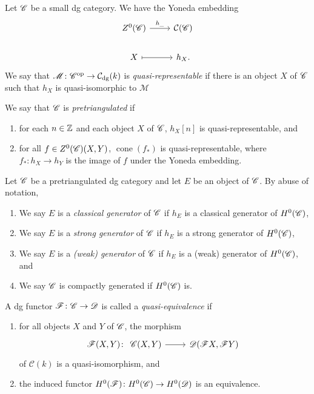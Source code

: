 \documentclass[dissertation.tex]{subfiles}
\begin{document}
\begin{defn}
  Let $\mathscr{C}$ be a small dg category.
  We have the Yoneda embedding 
  $$\begin{tikzcd}
    Z^0(\CC) \arrow{r}{h_{\_}} & \mathcal{C}(\CC)\\
    X \arrow[mapsto]{r} & h_X.
  \end{tikzcd}$$
  We say that $\mathscr{M} \colon \mathscr{C}^\text{op} \rightarrow \mathcal{C}_\text{dg}(k)$ is {\it quasi-representable} if there is an object $X$ of $\mathscr{C}$ such that $h_X$ is quasi-isomorphic to $\mathscr{M}$
  
  We say that $\mathscr{C}$ is {\it pretriangulated} if
  \begin{enumerate}
  \item
    for each $n \in \mathbb{Z}$ and each object $X$ of $\mathscr{C}$, $h_X[n]$ is quasi-representable, and
  \item
    for all $f \in Z^0(\mathscr{C})(X,Y)$, $\operatorname{cone}(f_*)$ is quasi-representable, where $f_* : h_X \rightarrow h_Y$ is the image of $f$ under the Yoneda embedding.
  \end{enumerate}
\end{defn}

\begin{defn}
  Let $\mathscr{C}$ be a pretriangulated dg category and let $E$ be an object of $\mathscr{C}$.
  By abuse of notation, 
  \begin{enumerate}
  \item
    We say $E$ is a {\it classical generator} of $\mathscr{C}$ if $h_E$ is a classical generator of $H^0(\mathscr{C})$,
  \item
    We say $E$ is a {\it strong generator} of $\mathscr{C}$ if $h_E$ is a strong generator of $H^0(\mathscr{C})$,
  \item
    We say $E$ is a {\it (weak) generator} of $\mathscr{C}$ if $h_E$ is a (weak) generator of $H^0(\mathscr{C})$, and
  \item
    We say $\mathscr{C}$ is compactly generated if $H^0(\mathscr{C})$ is.
  \end{enumerate}
\end{defn}


\begin{defn}
  A dg functor $\mathscr{F} \colon \mathscr{C} \rightarrow \mathscr{D}$ is called a {\it quasi-equivalence} if 
  \begin{enumerate}
  \item
    for all objects $X$ and $Y$ of $\mathscr{C}$, the morphism
    $$\mathscr{F}(X,Y) \colon
    \begin{tikzcd}
      \CC(X,Y) \arrow{r} & \D(\mathscr{F}X,\mathscr{F}Y)
    \end{tikzcd}$$
    of $\mathcal{C}(k)$ is a quasi-isomorphism, and
  \item
    the induced functor $H^0(\mathscr{F}) \colon H^0(\mathscr{C}) \rightarrow H^0(\mathscr{D})$ is an equivalence.
  \end{enumerate}
\end{defn}
\end{document}
